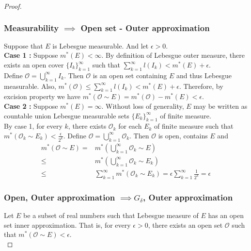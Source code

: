 \begin{proof}
\subsubsection*{Measurability $\implies$ Open set - Outer approximation}
	Suppose that $E$ is Lebesgue measurable.
	And let $\epsilon > 0$.\\


	\textbf{Case 1 :} Suppose $m^\ast(E) < \infty$.
	By definition of Lebesgue outer measure, there exists an open cover $\{ I_k \}_{k=1}^\infty$ such that $\displaystyle \sum_{k=1}^\infty l(I_k) <  m^\ast(E)+\epsilon$.\\

	Define $\mathcal{O} = \displaystyle \bigcup_{k=1}^\infty I_k$.
	Then $\mathcal{O}$ is an open set containing $E$ and thus Lebesgue measurable.
	Also, $\displaystyle m^\ast(\mathcal{O}) \le \sum_{k=1}^\infty l(I_k) < m^\ast(E) + \epsilon$.
	Therefore, by excision property we have $m^\ast(\mathcal{O} \sim E) = m^\ast(\mathcal{O}) - m^\ast(E) < \epsilon$. \\

	\textbf{Case 2 :} Suppose $m^\ast(E) = \infty$.
	Without loss of generality, $E$ may be written as countable union Lebesgue measurable sets $\{ E_k \}_{k=1}^\infty$ of finite measure.\\

	By case 1, for every $k$, there exists $\mathcal{O}_k$ for each $E_k$ of finite measure such that $m^\ast(\mathcal{O}_k \sim E_k) < \frac{\epsilon}{2^k}$.
	Define $\displaystyle \mathcal{O} = \bigcup_{k=1}^\infty \mathcal{O}_k$.
	Then $\mathcal{O}$ is open, contains $E$ and 
	\begin{align*}
		m^\ast(\mathcal{O} \sim E) = & m^\ast\left(\bigcup_{k=1}^\infty \mathcal{O}_k \sim E \right) \\
		\le & m^\ast \left(\bigcup_{k=1}^\infty \mathcal{O}_k \sim E_k \right) \\
		\le & \sum_{k=1}^\infty m^\ast(\mathcal{O}_k \sim E_k) = \epsilon \sum_{k=1}^\infty \frac{1}{2^k} = \epsilon
	\end{align*}

\subsubsection*{Open, Outer approximation $\implies G_\delta$, Outer approximation }
	Let $E$ be a subset of real numbers such that Lebesgue measure of $E$ has an open set inner approximation.
	That is, for every $\epsilon > 0$, there exists an open set $\mathcal{O}$ such that $m^\ast(\mathcal{O} \sim E) < \epsilon$.\\


\end{proof}
